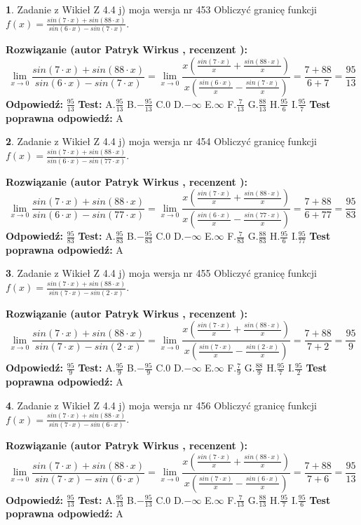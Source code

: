 \documentclass[12pt, a4paper]{article}
\theoremstyle{definition} %
\newtheorem{zad}{}
\newcommand{\zadStart}[1]{\begin{zad}#1\newline}
\newcommand{\zadStop}{\end{zad}}
\newcommand{\rozwStart}[2]{\noindent \textbf{Rozwiązanie (autor #1 , recenzent #2): }\newline}
\newcommand{\rozwStop}{\newline}
\newcommand{\odpStart}{\noindent \textbf{Odpowiedź:}\newline}
\newcommand{\odpStop}{\newline}
\newcommand{\testStart}{\noindent \textbf{Test:}\newline}
\newcommand{\testStop}{\newline}
\newcommand{\kluczStart}{\noindent \textbf{Test poprawna odpowiedź:}\newline}
\newcommand{\kluczStop}{\newline}
\begin{document}
\zadStart{Zadanie z Wikieł Z 4.4 j) moja wersja nr 453}
Obliczyć granicę funkcji $f(x)=\frac{sin(7\cdot x) +sin(88\cdot x)}{sin(6\cdot x) -sin(7\cdot x)}$.
\zadStop
\rozwStart{Patryk Wirkus}{}
$$\lim\limits_{x\to 0}\frac{sin(7\cdot x) +sin(88\cdot x)}{sin(6\cdot x) -sin(7\cdot x)}=\lim\limits_{x\to 0}\frac{x(\frac{sin(7\cdot x)}{x}+\frac{sin(88\cdot x)}{x})}{x(\frac{sin(6\cdot x)}{x}-\frac{sin(7\cdot x)}{x})}=\frac{7+88}{6+7} = \frac{95}{13}$$
\rozwStop
\odpStart
$\frac{95}{13}$
\odpStop
\testStart
A.$\frac{95}{13}$
B.$-\frac{95}{13}$
C.$0$
D.$-\infty$
E.$\infty$
F.$\frac{7}{13}$
G.$\frac{88}{13}$
H.$\frac{95}{6}$
I.$\frac{95}{7}$
\testStop
\kluczStart
A
\kluczStop



\zadStart{Zadanie z Wikieł Z 4.4 j) moja wersja nr 454}
Obliczyć granicę funkcji $f(x)=\frac{sin(7\cdot x) +sin(88\cdot x)}{sin(6\cdot x) -sin(77\cdot x)}$.
\zadStop
\rozwStart{Patryk Wirkus}{}
$$\lim\limits_{x\to 0}\frac{sin(7\cdot x) +sin(88\cdot x)}{sin(6\cdot x) -sin(77\cdot x)}=\lim\limits_{x\to 0}\frac{x(\frac{sin(7\cdot x)}{x}+\frac{sin(88\cdot x)}{x})}{x(\frac{sin(6\cdot x)}{x}-\frac{sin(77\cdot x)}{x})}=\frac{7+88}{6+77} = \frac{95}{83}$$
\rozwStop
\odpStart
$\frac{95}{83}$
\odpStop
\testStart
A.$\frac{95}{83}$
B.$-\frac{95}{83}$
C.$0$
D.$-\infty$
E.$\infty$
F.$\frac{7}{83}$
G.$\frac{88}{83}$
H.$\frac{95}{6}$
I.$\frac{95}{77}$
\testStop
\kluczStart
A
\kluczStop



\zadStart{Zadanie z Wikieł Z 4.4 j) moja wersja nr 455}
Obliczyć granicę funkcji $f(x)=\frac{sin(7\cdot x) +sin(88\cdot x)}{sin(7\cdot x) -sin(2\cdot x)}$.
\zadStop
\rozwStart{Patryk Wirkus}{}
$$\lim\limits_{x\to 0}\frac{sin(7\cdot x) +sin(88\cdot x)}{sin(7\cdot x) -sin(2\cdot x)}=\lim\limits_{x\to 0}\frac{x(\frac{sin(7\cdot x)}{x}+\frac{sin(88\cdot x)}{x})}{x(\frac{sin(7\cdot x)}{x}-\frac{sin(2\cdot x)}{x})}=\frac{7+88}{7+2} = \frac{95}{9}$$
\rozwStop
\odpStart
$\frac{95}{9}$
\odpStop
\testStart
A.$\frac{95}{9}$
B.$-\frac{95}{9}$
C.$0$
D.$-\infty$
E.$\infty$
F.$\frac{7}{9}$
G.$\frac{88}{9}$
H.$\frac{95}{7}$
I.$\frac{95}{2}$
\testStop
\kluczStart
A
\kluczStop



\zadStart{Zadanie z Wikieł Z 4.4 j) moja wersja nr 456}
Obliczyć granicę funkcji $f(x)=\frac{sin(7\cdot x) +sin(88\cdot x)}{sin(7\cdot x) -sin(6\cdot x)}$.
\zadStop
\rozwStart{Patryk Wirkus}{}
$$\lim\limits_{x\to 0}\frac{sin(7\cdot x) +sin(88\cdot x)}{sin(7\cdot x) -sin(6\cdot x)}=\lim\limits_{x\to 0}\frac{x(\frac{sin(7\cdot x)}{x}+\frac{sin(88\cdot x)}{x})}{x(\frac{sin(7\cdot x)}{x}-\frac{sin(6\cdot x)}{x})}=\frac{7+88}{7+6} = \frac{95}{13}$$
\rozwStop
\odpStart
$\frac{95}{13}$
\odpStop
\testStart
A.$\frac{95}{13}$
B.$-\frac{95}{13}$
C.$0$
D.$-\infty$
E.$\infty$
F.$\frac{7}{13}$
G.$\frac{88}{13}$
H.$\frac{95}{7}$
I.$\frac{95}{6}$
\testStop
\kluczStart
A
\kluczStop
\end{document}
